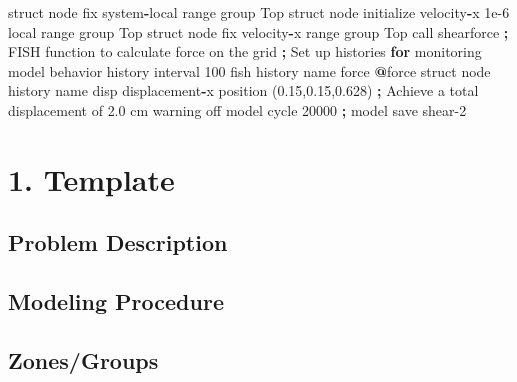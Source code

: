 \documentclass[a4paper, nobind]{templates/ociamthesis}
\newenvironment{Shaded}{\begin{snugshade}}{\end{snugshade}}
\newcommand{\BuiltInTok}[1]{#1}
\newcommand{\ControlFlowTok}[1]{\textcolor[rgb]{0.13,0.29,0.53}{\textbf{#1}}}
\newcommand{\DecValTok}[1]{\textcolor[rgb]{0.00,0.00,0.81}{#1}}
\newcommand{\FloatTok}[1]{\textcolor[rgb]{0.00,0.00,0.81}{#1}}
\newcommand{\NormalTok}[1]{#1}
\newcommand{\OperatorTok}[1]{\textcolor[rgb]{0.81,0.36,0.00}{\textbf{#1}}}
\newcommand{\StringTok}[1]{\textcolor[rgb]{0.31,0.60,0.02}{#1}}
\renewenvironment{Shaded}
{
  \vspace{10pt}%
  \begin{snugshade}%
}{%
  \end{snugshade}%
  \vspace{8pt}%
}
\begin{document}
\begin{Shaded}
\begin{Highlighting}[]
\NormalTok{    struct node fix system}\OperatorTok{{-}}\NormalTok{local }\BuiltInTok{range}\NormalTok{ group }\StringTok{\textquotesingle{}Top\textquotesingle{}}
\NormalTok{    struct node initialize velocity}\OperatorTok{{-}}\NormalTok{x }\FloatTok{1e{-}6}\NormalTok{ local }\BuiltInTok{range}\NormalTok{ group }\StringTok{\textquotesingle{}Top\textquotesingle{}}
\NormalTok{    struct node fix velocity}\OperatorTok{{-}}\NormalTok{x }\BuiltInTok{range}\NormalTok{ group }\StringTok{\textquotesingle{}Top\textquotesingle{}}
\NormalTok{    call }\StringTok{\textquotesingle{}shearforce\textquotesingle{}} \OperatorTok{;}\NormalTok{ FISH function to calculate force on the grid}
    \OperatorTok{;}\NormalTok{ Set up histories }\ControlFlowTok{for}\NormalTok{ monitoring model behavior}
\NormalTok{    history interval }\DecValTok{100}
\NormalTok{    fish history name }\StringTok{\textquotesingle{}force\textquotesingle{}} \OperatorTok{@}\NormalTok{force}
\NormalTok{    struct node history name }\StringTok{\textquotesingle{}disp\textquotesingle{}}\NormalTok{ displacement}\OperatorTok{{-}}\NormalTok{x position (}\FloatTok{0.15}\NormalTok{,}\FloatTok{0.15}\NormalTok{,}\FloatTok{0.628}\NormalTok{)}
    \OperatorTok{;}\NormalTok{ Achieve a total displacement of }\FloatTok{2.0}\NormalTok{ cm}
\NormalTok{    warning off}
\NormalTok{    model cycle }\DecValTok{20000}
    \OperatorTok{;}
\NormalTok{    model save }\StringTok{\textquotesingle{}shear{-}2\textquotesingle{}}
\end{Highlighting}
\end{Shaded}

\startappendices

\hypertarget{template}{%
\chapter{1. Template}\label{template}}

\hypertarget{problem-description-2}{%
\section{Problem Description}\label{problem-description-2}}

\hypertarget{modeling-procedure-1}{%
\section{Modeling Procedure}\label{modeling-procedure-1}}

\hypertarget{zonesgroups}{%
\section{Zones/Groups}\label{zonesgroups}}
\end{document}
